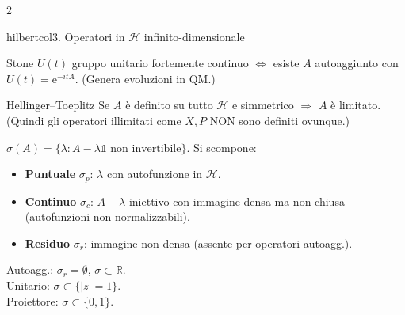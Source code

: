 \documentclass[10pt,a4paper]{article}
\newcommand{\R}{\mathbb{R}}
\newcommand{\eu}{\mathrm{e}}
\begin{document}
\begin{multicols}{2}
\begin{secbox}{hilbertcol}{3. Operatori in $\mathcal H$ infinito-dimensionale}
\begin{teobox}{Stone}
$U(t)$ gruppo unitario fortemente continuo $\iff$ esiste $A$ autoaggiunto con $U(t)=\eu^{-itA}$. (Genera evoluzioni in QM.)
\end{teobox}

\begin{teobox}{Hellinger--Toeplitz}
Se $A$ è definito su tutto $\mathcal H$ e simmetrico $\Rightarrow$ $A$ è limitato. (Quindi gli operatori illimitati come $X,P$ NON sono definiti ovunque.)
\end{teobox}

$\sigma(A)=\{\lambda:A-\lambda\mathbb 1\text{ non invertibile}\}$. Si scompone:
\begin{itemize}
\item \textbf{Puntuale} $\sigma_p$: $\lambda$ con autofunzione in $\mathcal H$.
\item \textbf{Continuo} $\sigma_c$: $A-\lambda$ iniettivo con immagine densa ma non chiusa (autofunzioni non normalizzabili).
\item \textbf{Residuo} $\sigma_r$: immagine non densa (assente per operatori autoagg.).
\end{itemize}
Autoagg.: $\sigma_r=\emptyset$, $\sigma\subset\R$.\\
Unitario: $\sigma\subset\{|z|=1\}$.\\
Proiettore: $\sigma\subset\{0,1\}$.


\end{secbox}
\end{multicols}
\end{document}
